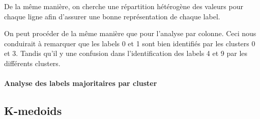 \documentclass[french,a4paper,18pt]{article}
\begin{document}
De la même manière, on cherche une répartition hétérogène des valeurs pour chaque ligne
afin d'assurer une bonne représentation de chaque label.

On peut procéder de la même manière que pour l'analyse par colonne. 
Ceci nous conduirait à remarquer que les labels 0 et 1 sont bien identifiés
par les clusters 0 et 3.
Tandis qu'il y une confusion dans l'identification des labels 4 et 9 par les différents clusters.

\paragraph{Analyse des labels majoritaires par cluster}



\subsection{K-medoids}
\end{document}
